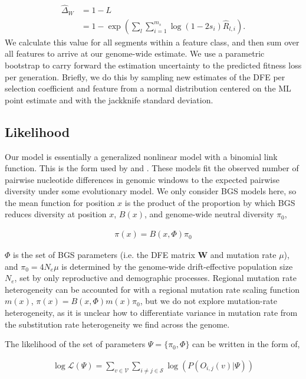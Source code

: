\documentclass[11pt]{article}
\begin{document}
\begin{align}
    \widehat{\Delta}_W &= 1 - L \\  \nonumber
             &= 1 - \exp\left(\sum_{l} \sum_{i=1}^{m_s} \log(1-2s_i) \widehat{R}_{l,i} \right).
\end{align}
%
We calculate this value for all segments within a feature class, and then sum
over all features to arrive at our genome-wide estimate. We use a parametric
bootstrap to carry forward the estimation uncertainty to the predicted fitness
loss per generation. Briefly, we do this by sampling new estimates of the DFE
per selection coefficient and feature from a normal distribution centered on
the ML point estimate and with the jackknife standard deviation.

\subsection{Likelihood}
\label{supp:likelihood}

Our model is essentially a generalized nonlinear model with a binomial link
function. This is the form used by \textcite{Elyashiv2016-vt} and
\textcite{Murphy2022-sj}. These models fit the observed number of pairwise
nucleotide differences in genomic windows to the expected pairwise diversity
under some evolutionary model. We only consider BGS models here, so the mean
function for position $x$ is the product of the proportion by which BGS reduces
diversity at position $x$, $B(x)$, and genome-wide neutral diversity $\pi_0$,

\begin{align}
  \pi(x) = B(x, \Phi) \pi_0
\end{align}

$\Phi$ is the set of BGS parameters (i.e. the DFE matrix $\mathbf{W}$ and
mutation rate $\mu$), and $\pi_0 = 4 N_e \mu$ is determined by the genome-wide
drift-effective population size $N_e$, set by only reproductive and demographic
processes. Regional mutation rate heterogeneity can be accounted for with a
regional mutation rate scaling function $m(x)$, $\pi(x) = B(x, \Phi) m(x)
\pi_0$, but we do not explore mutation-rate heterogeneity, as it is unclear how
to differentiate variance in mutation rate from the substitution rate
heterogeneity we find across the genome.

The likelihood of the set of parameters $\Psi = \{\pi_0, \Phi\}$ can be written
in the form of, 

\begin{align}
  \log\mathcal{L}(\Psi) = \sum_{v \in \mathcal{V}} \sum_{i \ne j \in \mathcal{S}} \log(P(O_{i,j}(v) | \Psi))
\end{align}
\end{document}
